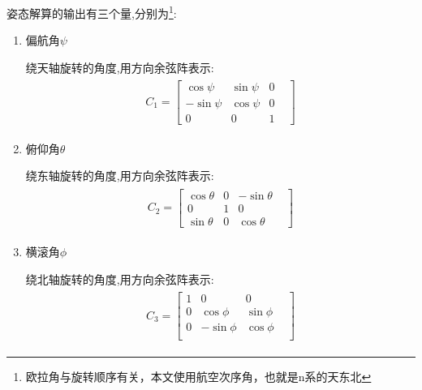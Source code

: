 \documentclass[12pt,a4paper]{article}
\begin{document}
姿态解算的输出有三个量,分别为\footnote{欧拉角与旋转顺序有关，本文使用航空次序角，也就是n系的天东北}:
\begin{enumerate}
    \item 偏航角$\psi$

        绕天轴旋转的角度,用方向余弦阵表示: 
        \begin{eqnarray}\label{偏航角方向余弦}
            \begin{split}
                C_1=\left[\begin{matrix}
                         \cos{\psi} & \sin{\psi} & 0 & \\
                        -\sin{\psi} & \cos{\psi} & 0 & \\
                                 0 &          0 & 1 &
                \end{matrix}\right]
            \end{split}
        \end{eqnarray}
    \item 俯仰角$\theta$

        绕东轴旋转的角度,用方向余弦阵表示: 
        \begin{eqnarray}\label{俯仰角方向余弦}
            \begin{split}
                C_2=\left[\begin{matrix}
                        \cos{\theta} & 0 & -\sin{\theta} & \\
                                   0 & 1 &           0 & \\
                        \sin{\theta} & 0 &  \cos{\theta} &
                \end{matrix}\right]
            \end{split}
        \end{eqnarray}
    \item 横滚角$\phi$

        绕北轴旋转的角度,用方向余弦阵表示: 
        \begin{eqnarray}\label{横滚角方向余弦}
            \begin{split}
                C_3=\left[\begin{matrix}
                        1 &           0 &          0 & \\
                        0 &  \cos{\phi} & \sin{\phi} & \\
                        0 & -\sin{\phi} & \cos{\phi} & \\
                \end{matrix}\right]
            \end{split}
        \end{eqnarray}
\end{enumerate}
\end{document}

